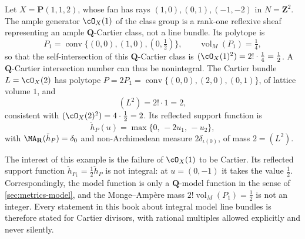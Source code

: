 \begin{example}
\label{ex:ch08-toric-weighted}
Let $X=\mathbf P(1,1,2)$, whose fan has rays $(1,0),(0,1),(-1,-2)$ in
$N=\mathbf Z^2$.  The ample generator $\cO_X(1)$ of the class group is a
rank-one reflexive sheaf representing an ample $\mathbf Q$-Cartier class,
not a line bundle.  Its polytope is
\[
 P_1=\operatorname{conv}\{(0,0),(1,0),(0,\tfrac12)\},
 \qquad
 \operatorname{vol}_M(P_1)=\tfrac14 ,
\]
so that the self-intersection of this $\mathbf Q$-Cartier class is
$(\cO_X(1)^2)=2!\cdot\tfrac14=\tfrac12$.  A $\mathbf Q$-Cartier
intersection number can thus be nonintegral.  The Cartier bundle
$L=\cO_X(2)$ has polytope $P=2P_1
=\operatorname{conv}\{(0,0),(2,0),(0,1)\}$, of lattice volume $1$, and
\[
 (L^2)=2!\cdot1=2 ,
\]
consistent with $(\cO_X(2)^2)=4\cdot\tfrac12=2$.  Its reflected support
function is
\[
 \check h_P(u)=\max\{0,\,-2u_1,\,-u_2\} ,
\]
with $\MA_{\mathbf R}(\check h_P)=\delta_0$ and non-Archimedean measure
$2\delta_{\iota(0)}$, of mass $2=(L^2)$.

The interest of this example is the failure of $\cO_X(1)$ to be Cartier.  Its
reflected support function $\check h_{P_1}=\tfrac12\check h_P$ is not
integral: at $u=(0,-1)$ it takes the value $\tfrac12$.  Correspondingly, the
model function is only a $\mathbf Q$-model function in the sense of
\cref{sec:metrics-model}, and the Monge--Amp\`ere mass
$2!\operatorname{vol}_M(P_1)=\tfrac12$ is not an integer.  Every statement in
this book about integral model line bundles is therefore stated for Cartier
divisors, with rational multiples allowed explicitly and never silently.
\end{example}

